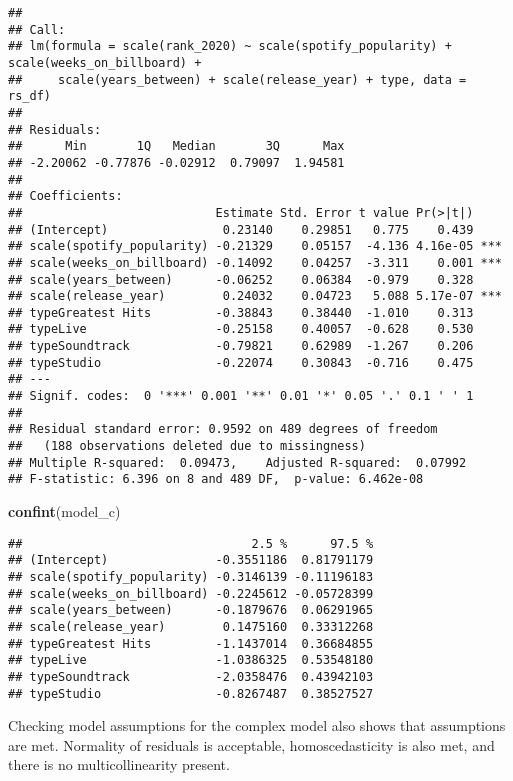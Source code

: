 \documentclass[
]{article}
\newenvironment{Shaded}{\begin{snugshade}}{\end{snugshade}}
\newcommand{\FunctionTok}[1]{\textcolor[rgb]{0.13,0.29,0.53}{\textbf{#1}}}
\newcommand{\NormalTok}[1]{#1}
\begin{document}
\begin{verbatim}
## 
## Call:
## lm(formula = scale(rank_2020) ~ scale(spotify_popularity) + scale(weeks_on_billboard) + 
##     scale(years_between) + scale(release_year) + type, data = rs_df)
## 
## Residuals:
##      Min       1Q   Median       3Q      Max 
## -2.20062 -0.77876 -0.02912  0.79097  1.94581 
## 
## Coefficients:
##                           Estimate Std. Error t value Pr(>|t|)    
## (Intercept)                0.23140    0.29851   0.775    0.439    
## scale(spotify_popularity) -0.21329    0.05157  -4.136 4.16e-05 ***
## scale(weeks_on_billboard) -0.14092    0.04257  -3.311    0.001 ***
## scale(years_between)      -0.06252    0.06384  -0.979    0.328    
## scale(release_year)        0.24032    0.04723   5.088 5.17e-07 ***
## typeGreatest Hits         -0.38843    0.38440  -1.010    0.313    
## typeLive                  -0.25158    0.40057  -0.628    0.530    
## typeSoundtrack            -0.79821    0.62989  -1.267    0.206    
## typeStudio                -0.22074    0.30843  -0.716    0.475    
## ---
## Signif. codes:  0 '***' 0.001 '**' 0.01 '*' 0.05 '.' 0.1 ' ' 1
## 
## Residual standard error: 0.9592 on 489 degrees of freedom
##   (188 observations deleted due to missingness)
## Multiple R-squared:  0.09473,    Adjusted R-squared:  0.07992 
## F-statistic: 6.396 on 8 and 489 DF,  p-value: 6.462e-08
\end{verbatim}

\begin{Shaded}
\begin{Highlighting}[]
\FunctionTok{confint}\NormalTok{(model\_c)}
\end{Highlighting}
\end{Shaded}

\begin{verbatim}
##                                2.5 %      97.5 %
## (Intercept)               -0.3551186  0.81791179
## scale(spotify_popularity) -0.3146139 -0.11196183
## scale(weeks_on_billboard) -0.2245612 -0.05728399
## scale(years_between)      -0.1879676  0.06291965
## scale(release_year)        0.1475160  0.33312268
## typeGreatest Hits         -1.1437014  0.36684855
## typeLive                  -1.0386325  0.53548180
## typeSoundtrack            -2.0358476  0.43942103
## typeStudio                -0.8267487  0.38527527
\end{verbatim}

Checking model assumptions for the complex model also shows that
assumptions are met. Normality of residuals is acceptable,
homoscedasticity is also met, and there is no multicollinearity present.
\end{document}
